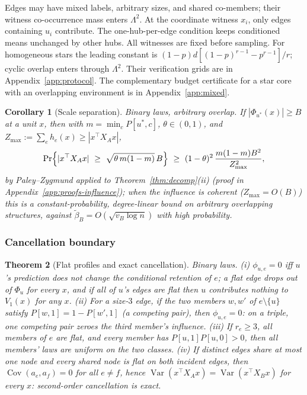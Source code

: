 \documentclass[preprint,11pt]{elsarticle}
\newtheorem{theorem}{Theorem}[section]
\newtheorem{corollary}[theorem]{Corollary}
\begin{document}
Edges may have mixed labels, arbitrary sizes, and shared co-members;
their witness co-occurrence mass enters $\Lambda^2$. At the coordinate
witness $x_i$, only edges containing $u_i$ contribute. The one-hub-per-edge
condition keeps conditioned means unchanged by other hubs. All witnesses
are fixed before sampling.
For homogeneous stars the leading constant is
$(1-p)d[(1-p)^{r-1}-p^{r-1}]/r$; cyclic overlap enters through
$\Lambda^2$. Their verification grids are in
Appendix~\ref{app:protocol}. The complementary budget certificate
for a star core with an overlapping environment is in
Appendix~\ref{app:mixed}.

\begin{corollary}[Scale separation]\label{cor:scale}
Binary laws, arbitrary overlap. If $|\Phi_{u^\ast}(x)|\ge B$ at a unit
$x$, then with $m=\min_cP[u^\ast,c]$, $\theta\in(0,1)$, and
$Z_{\max}:=\sum_eh_e(x)\ge|x^\top X_Ax|$,
\[
\Pr\Bigl\{|x^\top X_Ax|\ \ge\ \sqrt{\theta\,m(1-m)}\,B\Bigr\}
\ \ge\ (1-\theta)^2\,\frac{m(1-m)B^2}{Z_{\max}^2},
\]
by Paley--Zygmund applied to Theorem~\ref{thm:decomp}(ii) (proof in
Appendix~\ref{app:proofs-influence}); when the influence is coherent
($Z_{\max}=O(B)$) this is a constant-probability, degree-linear bound
on arbitrary overlapping structures, against
$\widetilde\beta_B=O(\sqrt{v_B\log n})$ with high probability.
\end{corollary}

\subsubsection{Cancellation boundary}\label{sec:cancel}

\begin{theorem}[Flat profiles and exact cancellation]\label{thm:cancel}
Binary laws. (i) $\phi_{u,e}=0$ iff $u$'s prediction does not change
the conditional retention of $e$; a flat edge drops out of $\Phi_u$
for every $x$, and if all of $u$'s edges are flat then $u$ contributes
nothing to $V_1(x)$ for any $x$. (ii) For a size-$3$ edge, if the two
members
$w,w'$ of $e\setminus\{u\}$ satisfy $P[w,1]=1-P[w',1]$ (a competing
pair), then $\phi_{u,e}=0$: on a triple, one competing pair zeroes
the third member's influence. (iii) If $r_e\ge3$, all members of $e$
are flat, and every member has $P[u,1]P[u,0]>0$, then all members'
laws are uniform on the two classes. (iv) If distinct edges share at
most one node and every shared node is flat on both incident edges,
then $\operatorname{Cov}(a_e,a_f)=0$ for all $e\ne f$, hence
$\operatorname{Var}(x^\top X_Ax)=\operatorname{Var}(x^\top X_Bx)$
\emph{for every} $x$: second-order cancellation is exact.
\end{theorem}
\end{document}
